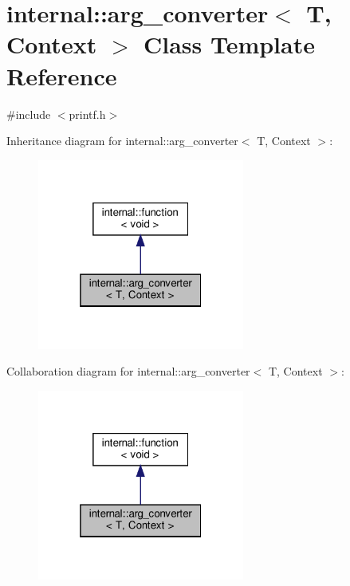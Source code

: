 \hypertarget{classinternal_1_1arg__converter}{}\section{internal\+:\+:arg\+\_\+converter$<$ T, Context $>$ Class Template Reference}
\label{classinternal_1_1arg__converter}


{\ttfamily \#include $<$printf.\+h$>$}



Inheritance diagram for internal\+:\+:arg\+\_\+converter$<$ T, Context $>$\+:
\nopagebreak
\begin{figure}[H]
\begin{center}
\leavevmode
\includegraphics[width=193pt]{classinternal_1_1arg__converter__inherit__graph}
\end{center}
\end{figure}


Collaboration diagram for internal\+:\+:arg\+\_\+converter$<$ T, Context $>$\+:
\nopagebreak
\begin{figure}[H]
\begin{center}
\leavevmode
\includegraphics[width=193pt]{classinternal_1_1arg__converter__coll__graph}
\end{center}
\end{figure}
